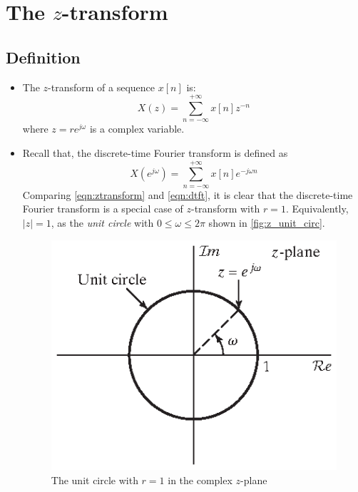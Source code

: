 \section{The $z$-transform}
\subsection{Definition}
\begin{itemize}
    \item The $z$-transform of a sequence $x[n]$ is:
        \begin{equation} \label{eqn:ztransform}
            X(z) = \sum_{n=-\infty}^{+\infty} x[n] z^{-n}
        \end{equation}
        where $z = re^{j\omega}$ is a complex variable.

    \item Recall that, the discrete-time Fourier transform is defined as
        \begin{equation} \label{eqn:dtft}
            X(e^{j\omega}) = \sum_{n=-\infty}^{+\infty} x[n] e^{-j\omega n}
        \end{equation}
    Comparing \autoref{eqn:ztransform} and \autoref{eqn:dtft}, it is clear that the discrete-time Fourier transform is a special case of $z$-transform with $r=1$. Equivalently, $\lvert z \rvert = 1$, as the \textit{unit circle} with $0 \leq \omega \leq 2\pi $ shown in \autoref{fig:z_unit_circ}.
    \begin{figure}[H]
        \centering
        \includegraphics{images/z_plane.eps}
        \caption{The unit circle with $r=1$ in the complex $z$-plane}
        \label{fig:z_unit_circ}
    \end{figure}
\end{itemize}

